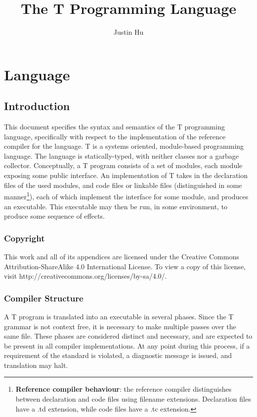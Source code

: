 \documentclass[letterpaper,12pt]{book}
\begin{document}
\title{The T Programming Language}
\author{Justin Hu}
\maketitle
\tableofcontents

\part{Language}

\chapter{Introduction}

This document specifies the syntax and semantics of the T programming language, specifically with respect to the implementation of the reference compiler for the language. T is a systems oriented, module-based programming language. The language is statically-typed, with neither classes nor a garbage collector. Conceptually, a T program consists of a set of modules, each module exposing some public interface. An implementation of T takes in the declaration files of the used modules, and code files or linkable files (distinguished in some manner\footnote{\textbf{Reference compiler behaviour}: the reference compiler distinguishes between declaration and code files using filename extensions. Declaration files have a .td extension, while code files have a .tc extension.}), each of which implement the interface for some module, and produces an executable. This executable may then be run, in some environment, to produce some sequence of effects.

\section{Copyright}

This work and all of its appendices are licensed under the Creative Commons Attribution-ShareAlike 4.0 International License. To view a copy of this license, visit http://creativecommons.org/licenses/by-sa/4.0/.

\section{Compiler Structure}

A T program is translated into an executable in several phases. Since the T grammar is not context free, it is necessary to make multiple passes over the same file. These phases are considered distinct and necessary, and are expected to be present in all compiler implementations. At any point during this process, if a requirement of the standard is violated, a diagnostic message is issued, and translation may halt.
\end{document}
